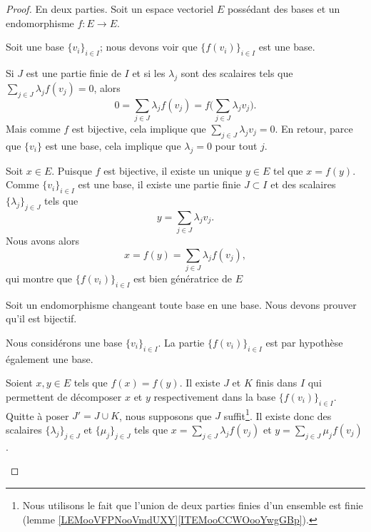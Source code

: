 \begin{proof}
	En deux parties. Soit un espace vectoriel \( E\) possédant des bases et un endomorphisme \( f\colon E\to E\).
	\begin{subproof}
		Soit une base \( \{ v_i \}_{i\in I}\); nous devons voir que \( \{ f(v_i) \}_{i\in I}\) est une base.
		\begin{subproof}
			\spitem[Libre]
			Si \( J\) est une partie finie de \( I\) et si les \( \lambda_j\) sont des scalaires tels que \( \sum_{j\in J}\lambda_jf(v_j)=0\), alors
			\begin{equation}
				0=\sum_{j\in J}\lambda_jf(v_j)=f\big( \sum_{j\in J}\lambda_jv_j \big).
			\end{equation}
			Mais comme \( f\) est bijective, cela implique que \( \sum_{j\in J}\lambda_jv_j=0\). En retour, parce que \( \{ v_i \}\) est une base, cela implique que \( \lambda_j=0\) pour tout \( j\).

			\spitem[Générateur]
			Soit \( x\in E\). Puisque \( f\) est bijective, il existe un unique \( y\in E\) tel que \( x=f(y)\). Comme \( \{ v_i \}_{i\in I}\) est une base, il existe une partie finie \( J\subset I\) et des scalaires \( \{ \lambda_j \}_{j\in J}\) tels que
			\begin{equation}
				y=\sum_{j\in J}\lambda_jv_j.
			\end{equation}
			Nous avons alors
			\begin{equation}
				x=f(y)=\sum_{j\in J}\lambda_jf(v_j),
			\end{equation}
			qui montre que \( \{ f(v_i) \}_{i\in I}\) est bien génératrice de \( E\)
		\end{subproof}
		Soit un endomorphisme changeant toute base en une base. Nous devons prouver qu'il est bijectif.
		\begin{subproof}
			\spitem[Injective]
			Nous considérons une base \( \{ v_i \}_{i\in I}\). La partie \( \{ f(v_i) \}_{i\in I}\) est par hypothèse également une base.

			Soient \( x,y\in E\) tels que \( f(x)=f(y)\). Il existe \( J\) et \( K\) finis dans \( I\) qui permettent de décomposer \( x\) et \( y\) respectivement dans la base \( \{ f(v_i) \}_{i\in I}\). Quitte à poser \( J'=J\cup K\), nous supposons que \( J\) suffit\footnote{Nous utilisons le fait que l'union de deux parties finies d'un ensemble est finie (lemme \ref{LEMooVFPNooVmdUXY}\ref{ITEMooCCWOooYwgGBp}).}. Il existe donc des scalaires \( \{ \lambda_j \}_{j\in J}\) et \( \{ \mu_j \}_{j\in J}\) tels que \( x=\sum_{j\in J}\lambda_jf(v_j)\) et \( y=\sum_{j\in J}\mu_jf(v_j)\).


\end{subproof}
\end{subproof}
\end{proof}
